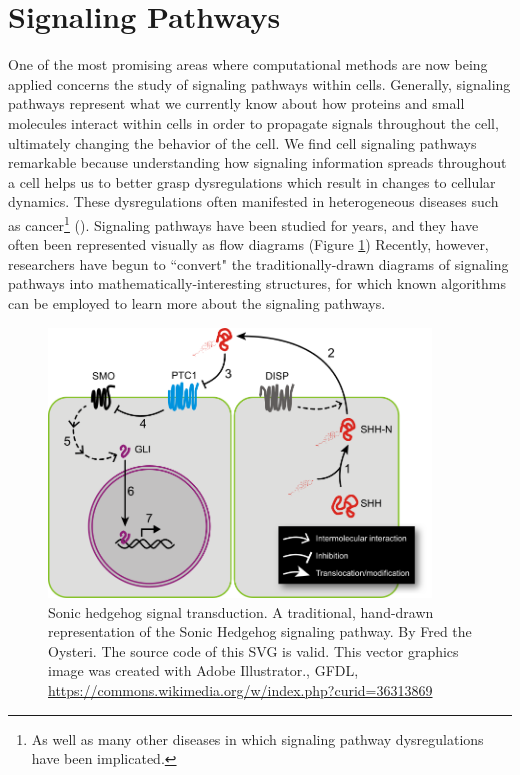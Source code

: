 \documentclass[12pt,twoside]{reedthesis}
\theoremstyle{definition}
\begin{document}
 \section{Signaling Pathways}

 One of the most promising areas where computational methods are now being applied concerns the study of signaling pathways within cells. Generally, signaling pathways represent what we currently know about how proteins and small molecules interact within cells in order to propagate signals throughout the cell, ultimately changing the behavior of the cell. We find cell signaling pathways remarkable because understanding how signaling information spreads throughout a cell helps us to better grasp dysregulations which result in changes to cellular dynamics. These dysregulations often manifested in heterogeneous diseases such as cancer\footnote{As well as many other diseases in which signaling pathway dysregulations have been implicated.} (\cite{Taylor2009}). Signaling pathways have been studied for years, and they have often been represented visually as flow diagrams (Figure \ref{fig:shh}) Recently, however, researchers have begun to ``convert" the traditionally-drawn diagrams of signaling pathways into mathematically-interesting structures, for which known algorithms can be employed to learn more about the signaling pathways.\par

 \begin{figure}[!h]
   \begin{center}
     \includegraphics[width=4in]{Sonic_hedgehog_pathway}
   \caption[Sonic hedgehog signal transduction.]{Sonic hedgehog signal transduction. A traditional, hand-drawn representation of the Sonic Hedgehog signaling pathway. By Fred the Oysteri. The source code of this SVG is valid. This vector graphics image was created with Adobe Illustrator., GFDL, \url{https://commons.wikimedia.org/w/index.php?curid=36313869}}
   \label{fig:shh}
   \end{center}
 \end{figure}
\end{document}
